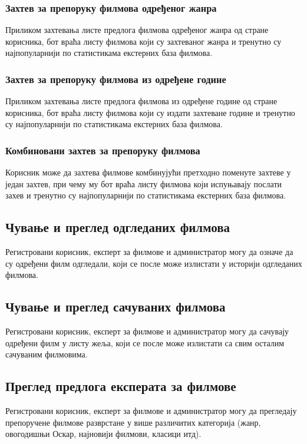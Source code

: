 \subsubsection{Захтев за препоруку филмова одређеног жанра}

Приликом захтевања листе предлога филмова одређеног жанра од стране корисника, бот враћа листу филмова који
су захтеваног жанра и тренутно су најпопуларнији по статистикама екстерних база филмова.

\subsubsection{Захтев за препоруку филмова из одређене године}

Приликом захтевања листе предлога филмова из одређене године од стране корисника, бот враћа листу филмова који
су издати захтеване године и тренутно су најпопуларнији по статистикама екстерних база филмова.

\subsubsection{Комбиновани захтев за препоруку филмова}

Корисник може да захтева филмове комбинујући претходно поменуте захтеве у један захтев, при чему му бот враћа
листу филмова који испуњавају послати захев и тренутно су најпопуларнији по статистикама екстерних база филмова.

\subsection{Чување и преглед одгледаних филмова}

Регистровани корисник, експерт за филмове и администратор могу да означе да су одређени филм одгледали, који се
после може излистати у историји одгледаних филмова.

\subsection{Чување и преглед сачуваних филмова}

Регистровани корисник, експерт за филмове и администратор могу да сачувају одређени филм у листу жеља, који се
после може излистати са свим осталим сачуваним филмовима.

\subsection{Преглед предлога експерата за филмове}

Регистровани корисник, експерт за филмове и администратор могу да прегледају препоручене филмове разврстане у
више различитих категорија (жанр, овогодишњи Оскар, најновији филмови, класици итд).
